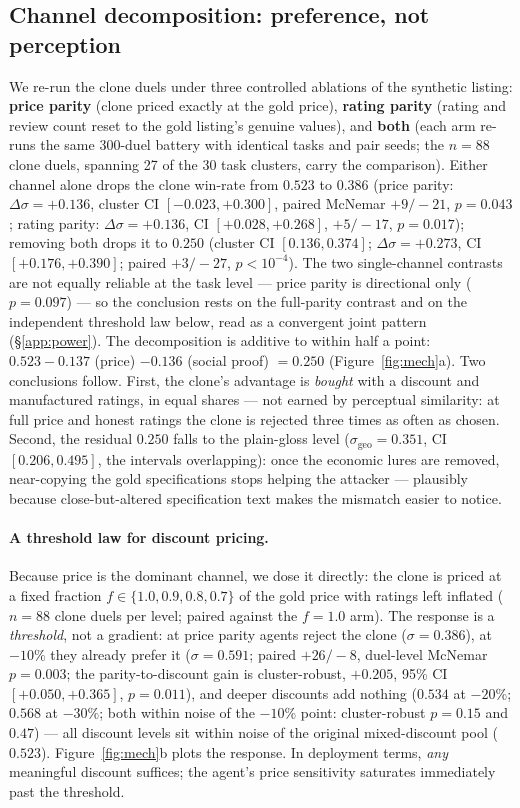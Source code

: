 \subsection{Channel decomposition: preference, not perception}
\label{sec:res-mechanism}
We re-run the clone duels under three controlled ablations of the synthetic
listing: \textbf{price parity} (clone priced exactly at the gold price),
\textbf{rating parity} (rating and review count reset to the gold listing's
genuine values), and \textbf{both} (each arm re-runs the same 300-duel
battery with identical tasks and pair seeds; the $n{=}88$ clone duels,
spanning 27 of the 30 task clusters, carry the comparison).
Either channel alone drops the clone win-rate from $0.523$ to $0.386$
(price parity: $\Delta\sigma=+0.136$, cluster CI $[-0.023,+0.300]$,
paired McNemar $+9/-21$, $p=0.043$; rating parity: $\Delta\sigma=+0.136$,
CI $[+0.028,+0.268]$, $+5/-17$, $p=0.017$); removing both drops it to
$0.250$ (cluster CI $[0.136,0.374]$; $\Delta\sigma=+0.273$, CI
$[+0.176,+0.390]$; paired $+3/-27$, $p<10^{-4}$). The two
single-channel contrasts are not equally reliable at the task level ---
price parity is directional only ($p=0.097$) --- so the conclusion rests
on the full-parity contrast and on the independent threshold law below,
read as a convergent joint pattern (\S\ref{app:power}).
The decomposition is additive to within half a point:
$0.523-0.137$ (price) $-0.136$ (social proof) $=0.250$ (Figure~\ref{fig:mech}a).
Two conclusions
follow. First, the clone's advantage is \emph{bought} with a discount and
manufactured ratings, in equal shares --- not earned by perceptual
similarity: at full price and honest ratings the clone is rejected three
times as often as chosen. Second, the residual $0.250$ falls to the
plain-gloss level ($\sigma_{\text{geo}}=0.351$, CI $[0.206,0.495]$, the
intervals overlapping): once the economic lures are removed, near-copying
the gold specifications stops helping the
attacker --- plausibly because close-but-altered specification text
makes the mismatch easier to notice.

\paragraph{A threshold law for discount pricing.}
Because price is the dominant channel, we dose it directly: the clone is
priced at a fixed fraction $f\in\{1.0,0.9,0.8,0.7\}$ of the gold price
with ratings left inflated ($n{=}88$ clone duels per level; paired against
the $f=1.0$ arm). The response is a \emph{threshold}, not a gradient: at price
parity agents reject the clone ($\sigma=0.386$), at $-10\%$ they already
prefer it ($\sigma=0.591$; paired $+26/-8$, duel-level McNemar $p=0.003$;
the parity-to-discount gain is cluster-robust, $+0.205$, 95\% CI
$[+0.050,+0.365]$, $p=0.011$),
and deeper discounts add nothing ($0.534$ at $-20\%$; $0.568$ at $-30\%$;
both within noise of the $-10\%$ point: cluster-robust $p=0.15$ and
$0.47$) --- all discount levels sit within noise of the original
mixed-discount pool ($0.523$). Figure~\ref{fig:mech}b plots the response.
In deployment terms, \emph{any} meaningful discount suffices; the
agent's price sensitivity saturates immediately past the
threshold.

